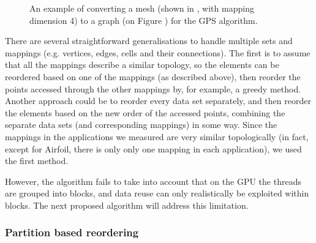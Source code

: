 \begin{figure}%
  \centering%
  \qquad
  \caption[]{An example of converting a mesh (shown in ,
  with mapping dimension 4) to a graph (on Figure ) for
  the GPS algorithm.}%
  \label{fig:mesh2graph}
\end{figure}

There are several straightforward generalisations to handle multiple sets and
mappings (e.g. vertices, edges, cells and their connections).  The first is to
assume that all the mappings describe a similar topology, so the elements can be
reordered based on one of the mappings (as described above), then reorder the
points accessed through the other mappings by, for example, a greedy method.
Another approach could be to reorder every data set separately, and then reorder
the elements based on the new order of the accessed points, combining the
separate data sets (and corresponding mappings) in some way. Since the mappings
in the applications we measured are very similar topologically (in fact, except
for Airfoil, there is only only one mapping in each application), we used the
first method.

However, the algorithm fails to take into account that on the GPU the threads
are grouped into blocks, and data reuse can only realistically be exploited
within blocks. The next proposed algorithm will address this limitation.

\subsubsection{Partition based reordering}

